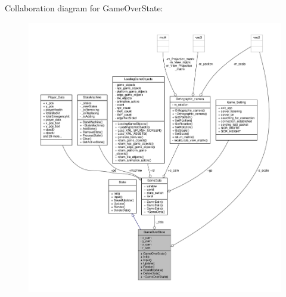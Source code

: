 Collaboration diagram for Game\+Over\+State\+:
\nopagebreak
\begin{figure}[H]
\begin{center}
\leavevmode
\includegraphics[width=350pt]{classGameOverState__coll__graph}
\end{center}
\end{figure}
